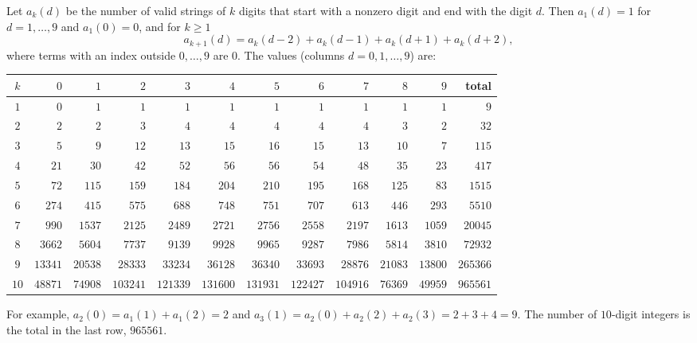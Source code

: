 Let $a_k(d)$ be the number of valid strings of $k$ digits that start with a nonzero digit and end with the digit $d$. Then $a_1(d)=1$ for $d=1,\dots,9$ and $a_1(0)=0$, and for $k\ge1$
\[a_{k+1}(d)=a_k(d-2)+a_k(d-1)+a_k(d+1)+a_k(d+2),\]
where terms with an index outside $0,\dots,9$ are $0$. The values (columns $d=0,1,\dots,9$) are:
\begin{center}
\begin{tabular}{c|rrrrrrrrrr|r}
$k$ & $0$ & $1$ & $2$ & $3$ & $4$ & $5$ & $6$ & $7$ & $8$ & $9$ & total\\
\hline
$1$ & $0$ & $1$ & $1$ & $1$ & $1$ & $1$ & $1$ & $1$ & $1$ & $1$ & $9$\\
$2$ & $2$ & $2$ & $3$ & $4$ & $4$ & $4$ & $4$ & $4$ & $3$ & $2$ & $32$\\
$3$ & $5$ & $9$ & $12$ & $13$ & $15$ & $16$ & $15$ & $13$ & $10$ & $7$ & $115$\\
$4$ & $21$ & $30$ & $42$ & $52$ & $56$ & $56$ & $54$ & $48$ & $35$ & $23$ & $417$\\
$5$ & $72$ & $115$ & $159$ & $184$ & $204$ & $210$ & $195$ & $168$ & $125$ & $83$ & $1515$\\
$6$ & $274$ & $415$ & $575$ & $688$ & $748$ & $751$ & $707$ & $613$ & $446$ & $293$ & $5510$\\
$7$ & $990$ & $1537$ & $2125$ & $2489$ & $2721$ & $2756$ & $2558$ & $2197$ & $1613$ & $1059$ & $20045$\\
$8$ & $3662$ & $5604$ & $7737$ & $9139$ & $9928$ & $9965$ & $9287$ & $7986$ & $5814$ & $3810$ & $72932$\\
$9$ & $13341$ & $20538$ & $28333$ & $33234$ & $36128$ & $36340$ & $33693$ & $28876$ & $21083$ & $13800$ & $265366$\\
$10$ & $48871$ & $74908$ & $103241$ & $121339$ & $131600$ & $131931$ & $122427$ & $104916$ & $76369$ & $49959$ & $965561$
\end{tabular}
\end{center}
For example, $a_2(0)=a_1(1)+a_1(2)=2$ and $a_3(1)=a_2(0)+a_2(2)+a_2(3)=2+3+4=9$. The number of $10$-digit integers is the total in the last row, $\boxed{965561}$.
